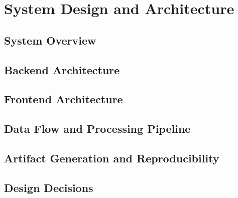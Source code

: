 \chapter{System Design and Architecture}
\label{cha:system-design-and-architecture}

\section{System Overview}

\section{Backend Architecture}

\section{Frontend Architecture}

\section{Data Flow and Processing Pipeline}

\section{Artifact Generation and Reproducibility}

\section{Design Decisions}
